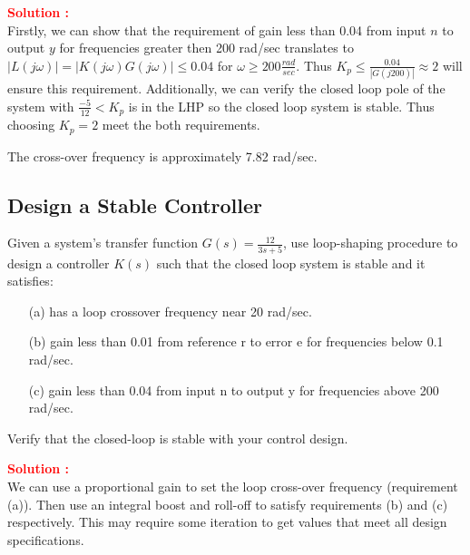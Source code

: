 \documentclass[12pt]{article}
\begin{document}
\textbf{\textcolor{red}{Solution :}} \\
Firstly, we can show that the requirement of gain less than 0.04 from input $n$ to output $y$ for frequencies greater then 200 rad/sec translates to $|L(j \omega)|=|K(j \omega) G(j \omega)| \leq 0.04$ for $\omega \geq 200 \frac{rad}{sec}$. Thus $K_p \leq \frac{0.04}{|G(j200)|} \approx 2$ will ensure this requirement. Additionally, we can verify the closed loop pole of the system with $\frac{-5}{12}<K_p$ is in the LHP so the closed loop system is stable. Thus choosing \(K_p = 2\) meet the both requirements.  

The cross-over frequency is approximately 7.82 rad/sec.\\
\clearpage

\subsection{Design a Stable Controller}

Given a system's transfer function $G(s) =\frac{12}{3s + 5} $, use loop-shaping procedure to design a controller $K(s)$ such that the closed loop system is stable and it satisfies:
\begin{itemize}
    \item [(a)] has a loop crossover frequency near 20 rad/sec.
    \item [(b)] gain less than 0.01 from reference r to error e for frequencies below 0.1 rad/sec.
    \item [(c)] gain less than 0.04 from input n to output y for frequencies above 200 rad/sec. 
\end{itemize}
Verify that the closed-loop is stable with your control design.

\textbf{\textcolor{red}{Solution :}} \\
We can use a proportional gain to set the loop cross-over frequency (requirement (a)). Then use an integral boost and roll-off to satisfy requirements (b) and (c) respectively. This may require some iteration to get values that meet all design specifications.
\end{document}
